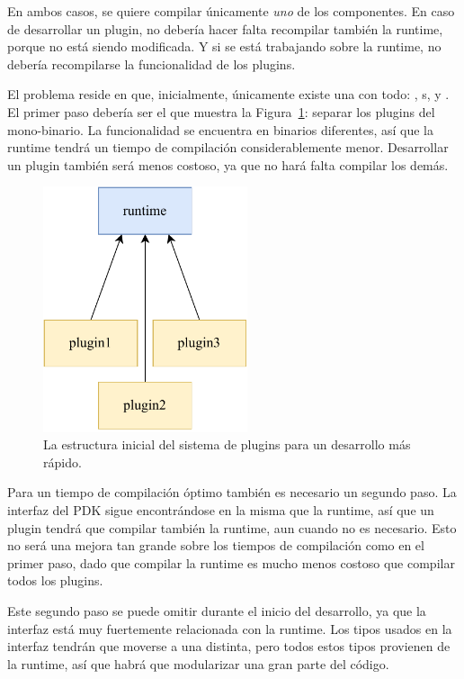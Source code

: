 En ambos casos, se quiere compilar únicamente \emph{uno} de los componentes. En
caso de desarrollar un plugin, no debería hacer falta recompilar también la
runtime, porque no está siendo modificada. Y si se está trabajando sobre la
runtime, no debería recompilarse la funcionalidad de los plugins.

El problema reside en que, inicialmente, únicamente existe una \crate con todo:
, s, y . El primer paso debería ser el
que muestra la Figura~\ref{fig:separation_temporary}: separar los plugins del
mono-binario. La funcionalidad se encuentra en binarios diferentes, así que la
runtime tendrá un tiempo de compilación considerablemente menor. Desarrollar un
plugin también será menos costoso, ya que no hará falta compilar los demás.

\begin{figure}
    \centering
    \includegraphics[width=6cm]{./Imagenes/separation-temporary.pdf}
    \caption{La estructura inicial del sistema de plugins para un desarrollo más
    rápido.}%
    \label{fig:separation_temporary}
\end{figure}

Para un tiempo de compilación óptimo también es necesario un segundo paso. La
interfaz del PDK sigue encontrándose en la misma \crate que la runtime, así que
un plugin tendrá que compilar también la runtime, aun cuando no es necesario.
Esto no será una mejora tan grande sobre los tiempos de compilación como en el
primer paso, dado que compilar la runtime es mucho menos costoso que compilar
todos los plugins.

Este segundo paso se puede omitir durante el inicio del desarrollo, ya que la
interfaz está muy fuertemente relacionada con la runtime. Los tipos usados en la
interfaz tendrán que moverse a una \crate distinta, pero todos estos tipos
provienen de la runtime, así que habrá que modularizar una gran parte del
código.

